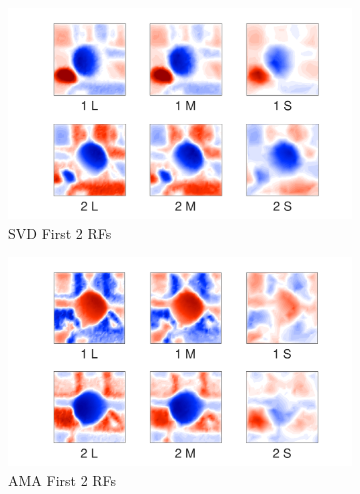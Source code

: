 \documentclass{jov}
\begin{document}
\begin{figure}
\centering
\begin{subfigure}[b]{0.27 \textwidth}
		\centering
        \includegraphics[width=\textwidth]{Figure7/case12SVD.pdf}
        \caption{SVD First 2 RFs}
        \label{fig:case12SVD}
    \end{subfigure}
    \begin{subfigure}[b]{0.27 \textwidth}   
        \includegraphics[width=\textwidth]{Figure7/case12AMA.pdf}
        \caption{AMA First 2 RFs}
        \label{fig:case12AMA}
    \end{subfigure}
        \begin{subfigure}[b]{0.20 \textwidth}

\end{subfigure}
\end{figure}
\end{document}
